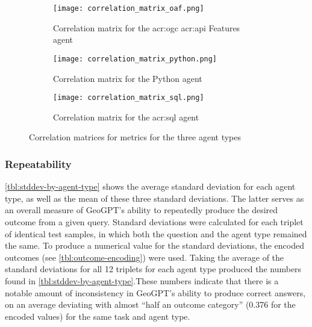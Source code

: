 \begin{figure}[htp]
    \centering

    \begin{subfigure}[b]{\textwidth}
        \texttt{[image: correlation\_matrix\_oaf.png]}
        \caption{Correlation matrix for the \acrshort{acr:ogc} \acrshort{acr:api} Features agent}
        \label{fig:sub1}
    \end{subfigure}

    \vspace{1cm} %

    \begin{subfigure}[b]{\textwidth}
        \texttt{[image: correlation\_matrix\_python.png]}
        \caption{Correlation matrix for the Python agent}
        \label{fig:sub2}
    \end{subfigure}

    \vspace{1cm} %

    \begin{subfigure}[b]{\textwidth}
        \texttt{[image: correlation\_matrix\_sql.png]}
        \caption{Correlation matrix for the \acrshort{acr:sql} agent}
        \label{fig:sub3}
    \end{subfigure}

    \caption{Correlation matrices for metrics for the three agent types}
    \label{fig:correlation-matrices}
\end{figure}

\subsubsection{Repeatability}

\autoref{tbl:stddev-by-agent-type} shows the average standard deviation for each agent type, as well as the mean of these three standard deviations. The latter serves as an overall measure of GeoGPT's ability to repeatedly produce the desired outcome from a given query. Standard deviations were calculated for each triplet of identical test samples, in which both the question and the agent type remained the same. To produce a numerical value for the standard deviations, the encoded outcomes (see \autoref{tbl:outcome-encoding}) were used. Taking the average of the standard deviations for all 12 triplets for each agent type produced the numbers found in \autoref{tbl:stddev-by-agent-type}.These numbers indicate that there is a notable amount of inconsistency in GeoGPT's ability to produce correct answers, on an average deviating with almost \enquote{half an outcome category} (0.376 for the encoded values) for the same task and agent type.

